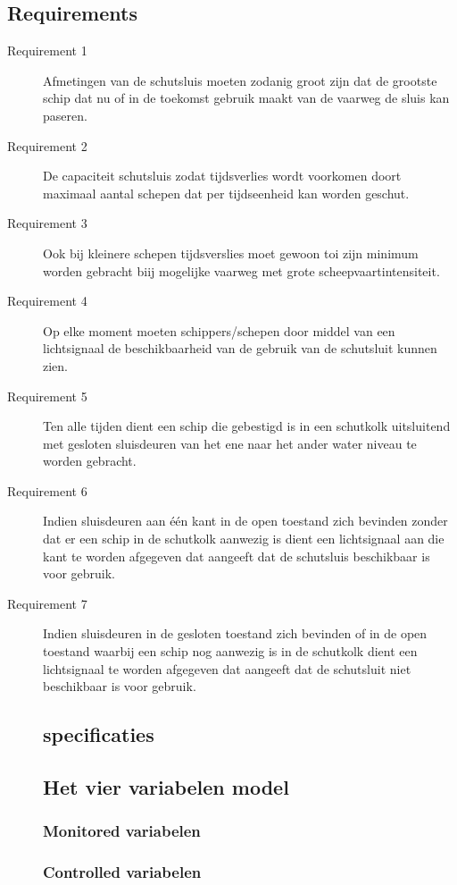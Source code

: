 \documentclass{article}
\begin{document}
\subsection{Requirements}
\begin{description}
\item [Requirement 1] Afmetingen van de schutsluis moeten zodanig groot zijn dat de grootste schip dat nu of in de toekomst
gebruik maakt van de vaarweg de sluis kan paseren.
\item [Requirement 2] De capaciteit schutsluis zodat tijdsverlies wordt voorkomen doort maximaal aantal schepen dat
per tijdseenheid kan worden geschut.
\item [Requirement 3] Ook bij kleinere schepen tijdsverslies moet gewoon toi zijn minimum worden gebracht biij mogelijke vaarweg met grote
scheepvaartintensiteit.
\item [Requirement 4] Op elke moment moeten schippers/schepen door middel van een lichtsignaal de beschikbaarheid van de gebruik
van de schutsluit kunnen zien.
\item [Requirement 5] Ten alle tijden dient een schip die gebestigd is in een schutkolk uitsluitend met gesloten sluisdeuren van het
ene naar het ander water niveau te worden gebracht.
\item [Requirement 6] Indien sluisdeuren aan één kant in de open toestand zich bevinden zonder dat er een schip
in de schutkolk aanwezig is dient een lichtsignaal aan die kant te worden afgegeven dat aangeeft dat de schutsluis beschikbaar is voor gebruik.
\item [Requirement 7] Indien sluisdeuren in de gesloten toestand zich bevinden of in de open toestand waarbij een schip nog
aanwezig is in de schutkolk dient een lichtsignaal te worden afgegeven dat aangeeft dat de schutsluit niet beschikbaar is voor gebruik.

\newpage
\subsection{specificaties}

\subsection{Het vier variabelen model}
\subsubsection{Monitored variabelen}
\subsubsection{Controlled variabelen}

\end{description}
\end{document}
